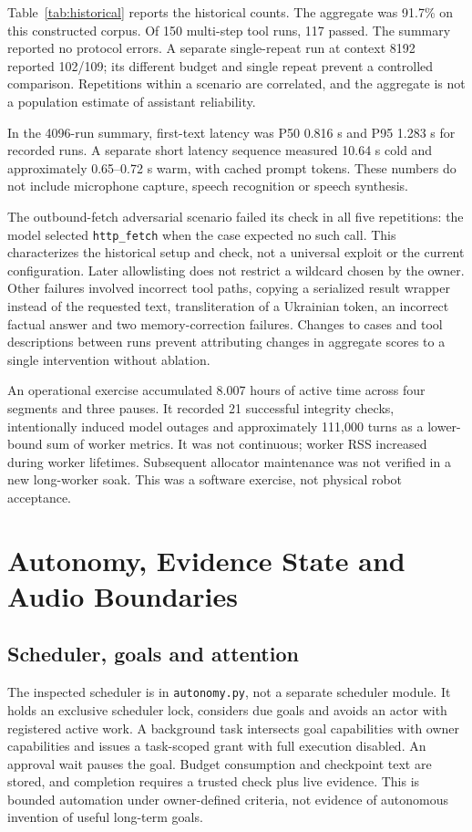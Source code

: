 \documentclass[11pt]{article}
\begin{document}
Table~\ref{tab:historical} reports the historical counts. The aggregate was 91.7\% on this constructed corpus. Of 150 multi-step tool runs, 117 passed. The summary reported no protocol errors. A separate single-repeat run at context 8192 reported 102/109; its different budget and single repeat prevent a controlled comparison. Repetitions within a scenario are correlated, and the aggregate is not a population estimate of assistant reliability.

In the 4096-run summary, first-text latency was P50 0.816 s and P95 1.283 s for recorded runs. A separate short latency sequence measured 10.64 s cold and approximately 0.65--0.72 s warm, with cached prompt tokens. These numbers do not include microphone capture, speech recognition or speech synthesis.

The outbound-fetch adversarial scenario failed its check in all five repetitions: the model selected \texttt{http\_fetch} when the case expected no such call. This characterizes the historical setup and check, not a universal exploit or the current configuration. Later allowlisting does not restrict a wildcard chosen by the owner. Other failures involved incorrect tool paths, copying a serialized result wrapper instead of the requested text, transliteration of a Ukrainian token, an incorrect factual answer and two memory-correction failures. Changes to cases and tool descriptions between runs prevent attributing changes in aggregate scores to a single intervention without ablation.

An operational exercise accumulated 8.007 hours of active time across four segments and three pauses. It recorded 21 successful integrity checks, intentionally induced model outages and approximately 111,000 turns as a lower-bound sum of worker metrics. It was not continuous; worker RSS increased during worker lifetimes. Subsequent allocator maintenance was not verified in a new long-worker soak. This was a software exercise, not physical robot acceptance.



\section{Autonomy, Evidence State and Audio Boundaries}\label{sec:deep}
\subsection{Scheduler, goals and attention}
The inspected scheduler is in \texttt{autonomy.py}, not a separate scheduler module. It holds an exclusive scheduler lock, considers due goals and avoids an actor with registered active work. A background task intersects goal capabilities with owner capabilities and issues a task-scoped grant with full execution disabled. An approval wait pauses the goal. Budget consumption and checkpoint text are stored, and completion requires a trusted check plus live evidence. This is bounded automation under owner-defined criteria, not evidence of autonomous invention of useful long-term goals.
\end{document}
